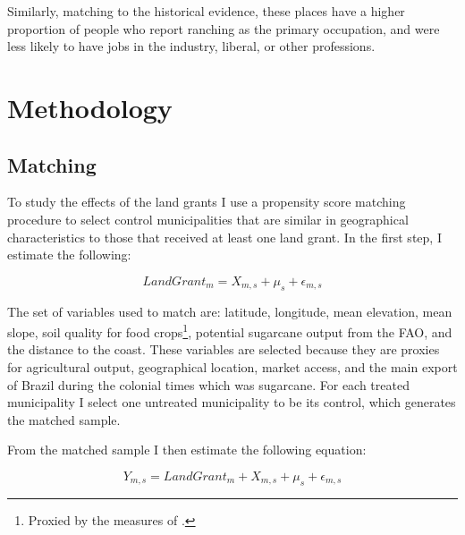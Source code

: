 \documentclass{article}
\begin{document}
Similarly, matching to the historical evidence, these places have a higher proportion of people who report ranching as the primary occupation, and were less likely to have jobs in the industry, liberal, or other professions. 

\section{Methodology}



\subsection{Matching}

To study the effects of the land grants I use a propensity score matching procedure to select control municipalities that are similar in geographical characteristics to those that received at least one land grant. In the first step, I estimate the following:

\begin{equation}
  LandGrant_m = X_{m,s} + \mu_s + \epsilon_{m,s}
\end{equation}

The set of variables used to match are: latitude, longitude, mean elevation, mean slope, soil quality for food crops\footnote{Proxied by the measures of \textcite{Galor2016-ba}.}, potential sugarcane output from the FAO, and the distance to the coast. These variables are selected because they are proxies for agricultural output, geographical location, market access, and the main export of Brazil during the colonial times which was sugarcane. For each treated municipality I select one untreated municipality to be its control, which generates the matched sample.

From the matched sample I then estimate the following equation:

\begin{equation}
  Y_{m,s} = LandGrant_m + X_{m,s} + \mu_s + \epsilon_{m,s}
\end{equation}
\end{document}
